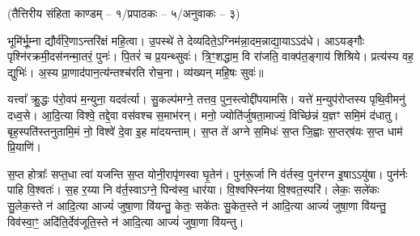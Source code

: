 \vspace{-1ex}
\centerline{\scriptsize (तैत्तिरीय संहिता काण्डम् – १/प्रपाठकः – ५/अनुवाकः – ३)}

भूमि॑र्भू॒म्ना द्यौर्व॑रि॒णाऽन्तरि॑क्षं महि॒त्वा। उ॒पस्थे॑ ते देव्यदिते॒ऽग्नि\-म॑न्ना॒दम॒न्नाद्या॒याऽऽद॑धे।
आऽयङ्गौः पृश्नि॑रक्रमी॒\-दस॑नन्मा॒तरं॒ पुनः॑। पि॒तरं॑ च प्र॒यन्थ्सुवः॑।
त्रि॒ꣳ॒शद्धाम॒ वि रा॑जति॒ वाक्प॑त॒ङ्गाय॑ शिश्रिये। प्रत्य॑स्य वह॒ द्युभिः॑। अ॒स्य प्रा॒णाद॑पान॒त्य॑न्तश्च॑रति रोच॒ना।
व्य॑ख्यन् महि॒षः सुवः॑॥

यत्त्वा᳚ क्रु॒द्धः प॑रो॒वप॑ म॒न्युना॒ यदव॑र्त्या। सु॒कल्प॑मग्ने॒ तत्तव॒ पुन॒स्त्वोद्दी॑पयामसि।
यत्ते॑ म॒न्युप॑रोप्तस्य पृथि॒वीमनु॑ दध्व॒से। आ॒दि॒त्या विश्वे॒ तद्दे॒वा वस॑वश्च स॒माभ॑रन्।
मनो॒ ज्योति॑र्जुषता॒माज्यं॒ विच्छि॑न्नं य॒ज्ञꣳ समि॒मं द॑धातु। बृह॒स्पति॑स्तनुतामि॒मं नो॒ विश्वे॑ दे॒वा इ॒ह मा॑दयन्ताम्।
 स॒प्त ते॑ अग्ने स॒मिधः॑ स॒प्त जि॒ह्वाः स॒प्तर्‌ष॑यः स॒प्त धाम॑ प्रि॒याणि॑। 

स॒प्त होत्राः᳚ सप्त॒धा त्वा॑ यजन्ति स॒प्त योनी॒रापृ॑णस्वा घृ॒तेन॑। पुन॑रू॒र्जा नि व॑र्तस्व॒ पुन॑रग्न इ॒षाऽऽयु॑षा। पुन॑र्नः पाहि वि॒श्वतः॑। स॒ह र॒य्या नि व॑र्त॒स्वाऽग्ने॒ पिन्व॑स्व॒ धार॑या। वि॒श्वफ्स्नि॑या वि॒श्वत॒स्परि॑। लेकः॒ सले॑कः सु॒लेक॒स्ते न॑ आदि॒त्या आज्यं॑ जुषा॒णा वि॑यन्तु॒ केतः॒ सके॑तः सु॒केत॒स्ते न॑ आदि॒त्या आज्यं॑ जुषा॒णा वि॑यन्तु॒ विव॑स्वा॒ꣳ॒ अदि॑ति॒र्देव॑जूति॒स्ते न॑ आदि॒त्या आज्यं॑ जुषा॒णा वि॑यन्तु।

